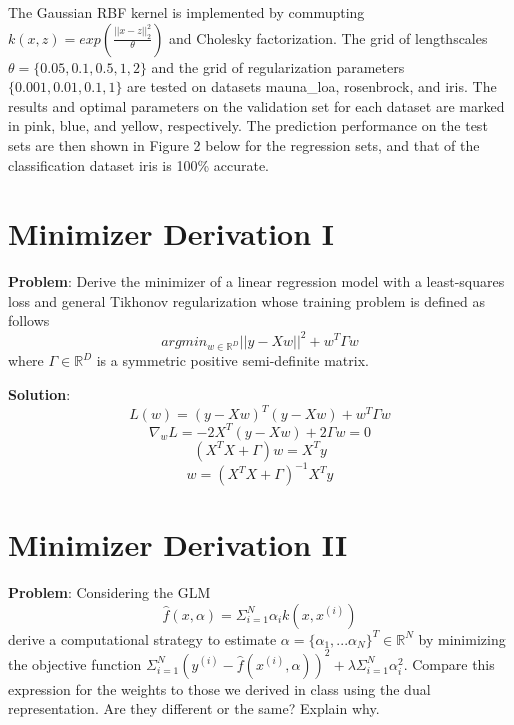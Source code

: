 \documentclass{article} %
\begin{document}
The Gaussian RBF kernel is implemented by commupting $k(x,z) = exp(\frac{||x-z||_2^2}{\theta})$ and Cholesky factorization. The grid of lengthscales $\theta = \{0.05, 0.1, 0.5, 1, 2\}$ and the grid of regularization parameters $\{0.001, 0.01, 0.1, 1\}$ are tested on datasets mauna\_loa, rosenbrock, and iris. The results and optimal parameters on the validation set for each dataset are marked in pink, blue, and yellow, respectively. The prediction performance on the test sets are then shown in Figure 2 below for the regression sets, and that of the classification dataset iris is 100\% accurate.




\vspace{0.4cm}
\section*{Minimizer Derivation I}
\textbf{Problem}: Derive the minimizer of a linear regression model with a least-squares loss and general Tikhonov regularization whose training problem is defined as follows
$$argmin_{w\in \mathbb{R}^D} ||y - Xw||^2 + w^T\Gamma w$$
where $\Gamma\in \mathbb{R}^D$ is a symmetric positive semi-definite matrix.

\textbf{Solution}:
$$L(w) = (y-Xw)^T(y-Xw)+ w^T\Gamma w$$
$$\nabla_wL = -2X^T(y-Xw)+ 2\Gamma w = 0$$
$$(X^TX+\Gamma)w = X^Ty$$
$$w = (X^TX+\Gamma)^{-1}X^Ty$$


\vspace{0.4cm}
\section*{Minimizer Derivation II}
\textbf{Problem}: Considering the GLM
$$\hat f(x, \alpha) = \Sigma_{i=1}^N \alpha_i k(x, x^{(i)})$$ derive a computational strategy to estimate $\alpha = \{\alpha_1, ... \alpha_N\}^T\in \mathbb{R}^N$ by minimizing the objective function $\Sigma_{i=1}^N (y^{(i)}-\hat f(x^{(i)}, \alpha))^2+ \lambda\Sigma_{i=1}^N \alpha_i^2$. Compare this expression for the weights to those we derived in class using the dual representation. Are they different or the same? Explain why.
\end{document}
